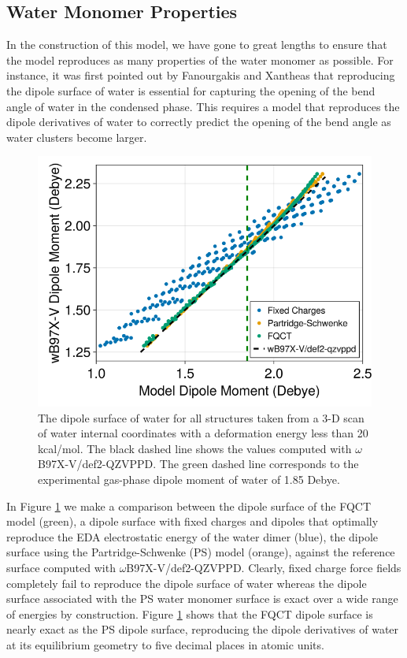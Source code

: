 \documentclass[journal=jctcce,manuscript=article]{achemso}
\begin{document}
\subsection*{Water Monomer Properties}
In the construction of this model, we have gone to great lengths to ensure that the model reproduces as many properties of the water monomer as possible. For instance, it was first pointed out by Fanourgakis and Xantheas that reproducing the dipole surface of water is essential for capturing the opening of the bend angle of water in the condensed phase.\cite{fanourgakis2006flexible} This requires a model that reproduces the dipole derivatives of water to correctly predict the opening of the bend angle as water clusters become larger. 
\begin{figure}[H]
  \includegraphics*[width=\textwidth]{figures/dipole_surface.png}
  \caption{The dipole surface of water for all structures taken from a
  3-D scan of water internal coordinates with a deformation energy less than
  20 kcal/mol. The black dashed line shows the values computed with $\omega$B97X-V/def2-QZVPPD.
  The green dashed line corresponds to the experimental gas-phase dipole moment
  of water of 1.85 Debye.
}
  \label{fig:dipole_surface}
\end{figure}
In Figure \ref{fig:dipole_surface} we make a comparison between the dipole surface of the FQCT model (green), a dipole surface with fixed charges and dipoles that optimally reproduce the EDA electrostatic energy of the water dimer (blue), the dipole surface using the Partridge-Schwenke (PS) model\cite{partridge1997determination} (orange), against the reference surface computed with $\omega$B97X-V/def2-QZVPPD. Clearly, fixed charge force fields completely fail to reproduce the dipole surface of water whereas the dipole surface associated with the PS water monomer surface is exact over a wide range of energies by construction.\cite{partridge1997determination} Figure \ref{fig:dipole_surface} shows that the FQCT dipole surface is nearly exact as the PS dipole surface, reproducing the dipole derivatives of water at its equilibrium geometry to five decimal places in atomic units.
\end{document}
